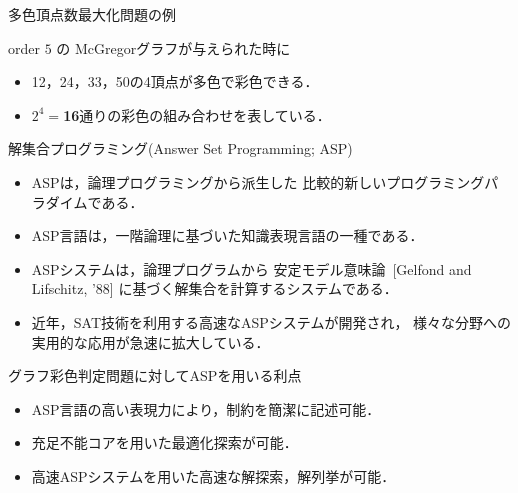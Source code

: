 \documentclass[dvipdfmx,11pt]{beamer}
\begin{document}
\begin{frame}{多色頂点数最大化問題の例}
\begin{block}{}
 order $5$ の McGregorグラフが与えられた時に%
\end{block}

\begin{alertblock}{}
 \begin{itemize}
  \item 12，24，33，50の4頂点が多色で彩色できる．
  \item $2^4=$\alert{\textbf{16}}通りの彩色の組み合わせを表している．%
 \end{itemize}
\end{alertblock}

\end{frame}


\begin{frame}{解集合プログラミング(Answer Set Programming; ASP)}

 \begin{itemize}
  \item \alert{ASP}は，論理プログラミングから派生した
        比較的新しいプログラミングパラダイムである．
  \item \alert{ASP言語}は，一階論理に基づいた知識表現言語の一種である．
  \item \alert{ASPシステム}は，論理プログラムから
        安定モデル意味論~{\scriptsize[Gelfond and Lifschitz, '88]}
        に基づく解集合を計算するシステムである．
  \item 近年，SAT技術を利用する高速なASPシステムが開発され，
        様々な分野への実用的な応用が急速に拡大している．
 \end{itemize}
 
 \begin{alertblock}{グラフ彩色判定問題に対してASPを用いる利点}
  \begin{itemize}
   \item ASP言語の高い表現力により，制約を簡潔に記述可能．
   \item 充足不能コアを用いた最適化探索が可能．
   \item 高速ASPシステムを用いた高速な解探索，解列挙が可能．
  \end{itemize}
 \end{alertblock}
 
\end{frame}

\end{document}
